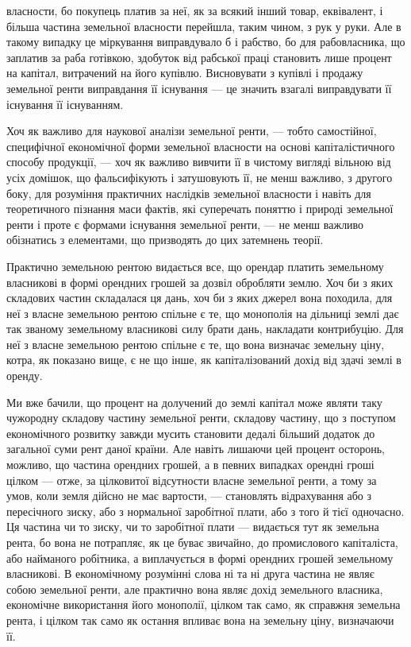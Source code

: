 \parcont{}  %
власности, бо покупець платив за неї, як за всякий інший товар, еквівалент,
і більша частина земельної власности перейшла, таким чином, з рук у руки.
Але в такому випадку це міркування виправдувало б і рабство, бо для рабовласника,
що заплатив за раба готівкою, здобуток від рабської праці становить
лише процент на капітал, витрачений на його купівлю. Висновувати з купівлі
і продажу земельної ренти виправдання її існування — це значить взагалі
виправдувати її існування її існуванням.

Хоч як важливо для наукової аналізи земельної ренти, — тобто самостійної,
специфічної економічної форми земельної власности на основі капіталістичного
способу продукції, — хоч як важливо вивчити її в чистому вигляді вільною від
усіх домішок, що фальсифікують і затушовують її, не менш важливо, з другого
боку, для розуміння практичних наслідків земельної власности і навіть
для теоретичного пізнання маси фактів, які суперечать поняттю і природі земельної
ренти і проте є формами існування земельної ренти, — не менш важливо
обізнатись з елементами, що призводять до цих затемнень теорії.

Практично земельною рентою видається все, що орендар платить земельному
власникові в формі орендних грошей за дозвіл обробляти землю.
Хоч би з яких складових частин складалася ця дань, хоч би з яких джерел
вона походила, для неї з власне земельною рентою спільне є те, що монополія
на дільниці землі дає так званому земельному власникові силу брати
дань, накладати контрибуцію. Для неї з власне земельною рентою спільне є те,
що вона визначає земельну ціну, котра, як показано вище, є не що інше, як
капіталізований дохід від здачі землі в оренду.

Ми вже бачили, що процент на долучений до землі капітал може являти
таку чужородну складову частину земельної ренти, складову частину, що з поступом
економічного розвитку завжди мусить становити дедалі більший додаток
до загальної суми рент даної країни. Але навіть лишаючи цей процент осторонь,
можливо, що частина орендних грошей, а в певних випадках орендні
гроші цілком — отже, за цілковитої відсутности власне земельної ренти, а
тому за умов, коли земля дійсно не має вартости, — становлять відрахування
або з пересічного зиску, або з нормальної заробітної плати, або з того
й тієї одночасно. Ця частина чи то зиску, чи то заробітної плати — видається
тут як земельна рента, бо вона не потрапляє, як це буває звичайно, до промислового
капіталіста, або найманого робітника, а виплачується в формі орендних
грошей земельному власникові. В економічному розумінні слова ні та ні друга
частина не являє собою земельної ренти, але практично вона являє дохід
земельного власника, економічне використання його монополії, цілком так само,
як справжня земельна рента, і цілком так само як остання впливає вона на
земельну ціну, визначаючи її.

